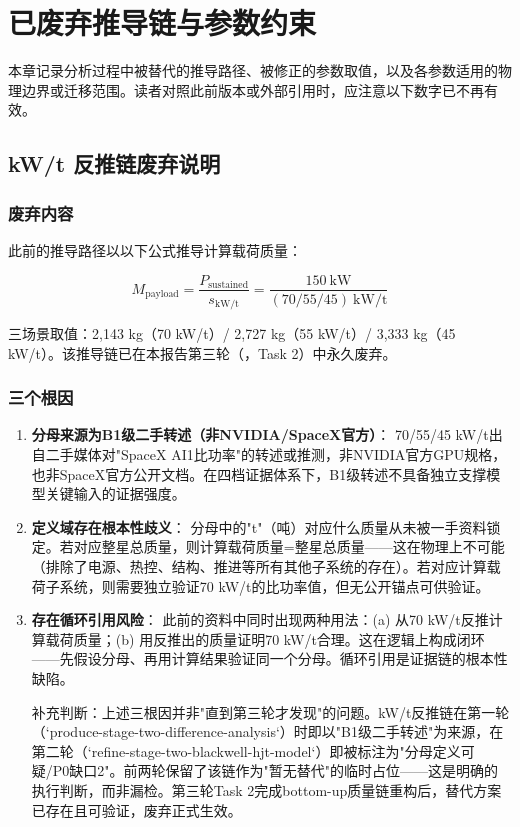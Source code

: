 
\section{已废弃推导链与参数约束}

本章记录分析过程中被替代的推导路径、被修正的参数取值，以及各参数适用的物理边界或迁移范围。读者对照此前版本或外部引用时，应注意以下数字已不再有效。

\subsection{kW/t 反推链废弃说明}
\label{sec:deprecated-kwt}

\subsubsection{废弃内容}

此前的推导路径以以下公式推导计算载荷质量：

\begin{equation}
  M_{\mathrm{payload}} = \frac{P_{\mathrm{sustained}}}{s_{\mathrm{kW/t}}}
                       = \frac{150\ \mathrm{kW}}{(70/55/45)\ \mathrm{kW/t}}
  \label{eq:deprecated-kwt}
\end{equation}

三场景取值：2,143 kg（70 kW/t）/ 2,727 kg（55 kW/t）/ 3,333 kg（45 kW/t）。该推导链已在本报告第三轮（，Task 2）中永久废弃。

\subsubsection{三个根因}

\begin{enumerate}
  \item \textbf{分母来源为B1级二手转述（非NVIDIA/SpaceX官方）}：
  70/55/45 kW/t出自二手媒体对"SpaceX AI1比功率"的转述或推测，非NVIDIA官方GPU规格，也非SpaceX官方公开文档。在四档证据体系下，B1级转述不具备独立支撑模型关键输入的证据强度。

  \item \textbf{定义域存在根本性歧义}：
  分母中的"t"（吨）对应什么质量从未被一手资料锁定。若对应整星总质量，则计算载荷质量=整星总质量——这在物理上不可能（排除了电源、热控、结构、推进等所有其他子系统的存在）。若对应计算载荷子系统，则需要独立验证70 kW/t的比功率值，但无公开锚点可供验证。

  \item \textbf{存在循环引用风险}：
  此前的资料中同时出现两种用法：(a) 从70 kW/t反推计算载荷质量；(b) 用反推出的质量证明70 kW/t合理。这在逻辑上构成闭环——先假设分母、再用计算结果验证同一个分母。循环引用是证据链的根本性缺陷。

  补充判断：上述三根因并非"直到第三轮才发现"的问题。kW/t反推链在第一轮（`produce-stage-two-difference-analysis`）时即以"B1级二手转述"为来源，在第二轮（`refine-stage-two-blackwell-hjt-model`）即被标注为"分母定义可疑/P0缺口2"。前两轮保留了该链作为"暂无替代"的临时占位——这是明确的执行判断，而非漏检。第三轮Task 2完成bottom-up质量链重构后，替代方案已存在且可验证，废弃正式生效。
\end{enumerate}

